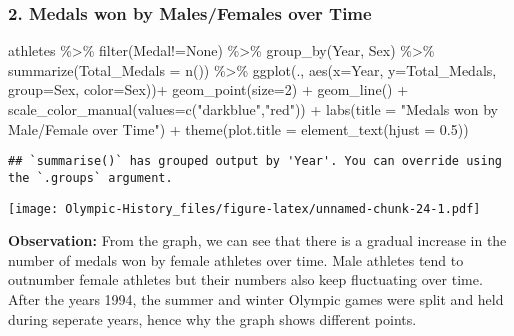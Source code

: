 \documentclass[
]{article}
\newenvironment{Shaded}{\begin{snugshade}}{\end{snugshade}}
\newcommand{\AttributeTok}[1]{\textcolor[rgb]{0.77,0.63,0.00}{#1}}
\newcommand{\DecValTok}[1]{\textcolor[rgb]{0.00,0.00,0.81}{#1}}
\newcommand{\FloatTok}[1]{\textcolor[rgb]{0.00,0.00,0.81}{#1}}
\newcommand{\FunctionTok}[1]{\textcolor[rgb]{0.00,0.00,0.00}{#1}}
\newcommand{\NormalTok}[1]{#1}
\newcommand{\SpecialCharTok}[1]{\textcolor[rgb]{0.00,0.00,0.00}{#1}}
\newcommand{\StringTok}[1]{\textcolor[rgb]{0.31,0.60,0.02}{#1}}
\begin{document}
\hypertarget{medals-won-by-malesfemales-over-time}{%
\subsubsection{2. Medals won by Males/Females over
Time}\label{medals-won-by-malesfemales-over-time}}

\begin{Shaded}
\begin{Highlighting}[]
\NormalTok{athletes }\SpecialCharTok{\%\textgreater{}\%} 
  \FunctionTok{filter}\NormalTok{(Medal}\SpecialCharTok{!=}\StringTok{\textquotesingle{}None\textquotesingle{}}\NormalTok{) }\SpecialCharTok{\%\textgreater{}\%}
  \FunctionTok{group\_by}\NormalTok{(Year, Sex) }\SpecialCharTok{\%\textgreater{}\%}
  \FunctionTok{summarize}\NormalTok{(}\AttributeTok{Total\_Medals =} \FunctionTok{n}\NormalTok{()) }\SpecialCharTok{\%\textgreater{}\%}
  \FunctionTok{ggplot}\NormalTok{(., }\FunctionTok{aes}\NormalTok{(}\AttributeTok{x=}\NormalTok{Year, }\AttributeTok{y=}\NormalTok{Total\_Medals, }\AttributeTok{group=}\NormalTok{Sex, }\AttributeTok{color=}\NormalTok{Sex))}\SpecialCharTok{+}
  \FunctionTok{geom\_point}\NormalTok{(}\AttributeTok{size=}\DecValTok{2}\NormalTok{) }\SpecialCharTok{+}
  \FunctionTok{geom\_line}\NormalTok{()  }\SpecialCharTok{+}
  \FunctionTok{scale\_color\_manual}\NormalTok{(}\AttributeTok{values=}\FunctionTok{c}\NormalTok{(}\StringTok{"darkblue"}\NormalTok{,}\StringTok{"red"}\NormalTok{)) }\SpecialCharTok{+}
  \FunctionTok{labs}\NormalTok{(}\AttributeTok{title =} \StringTok{"Medals won by Male/Female over Time"}\NormalTok{) }\SpecialCharTok{+}
  \FunctionTok{theme}\NormalTok{(}\AttributeTok{plot.title =} \FunctionTok{element\_text}\NormalTok{(}\AttributeTok{hjust =} \FloatTok{0.5}\NormalTok{))}
\end{Highlighting}
\end{Shaded}

\begin{verbatim}
## `summarise()` has grouped output by 'Year'. You can override using the `.groups` argument.
\end{verbatim}

\texttt{[image: Olympic-History\_files/figure-latex/unnamed-chunk-24-1.pdf]}

\textbf{Observation:} From the graph, we can see that there is a gradual
increase in the number of medals won by female athletes over time. Male
athletes tend to outnumber female athletes but their numbers also keep
fluctuating over time. After the years 1994, the summer and winter
Olympic games were split and held during seperate years, hence why the
graph shows different points.
\end{document}
